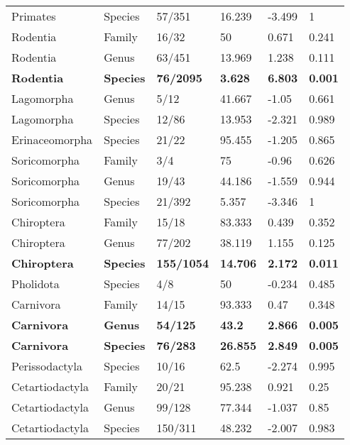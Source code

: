 \begin{longtable}{llllll}
  Primates & Species & 57/351 & 16.239 & -3.499 & 1 \\ 
  Rodentia & Family & 16/32 & 50 & 0.671 & 0.241 \\ 
  Rodentia & Genus & 63/451 & 13.969 & 1.238 & 0.111 \\ 
  \textbf{Rodentia} & \textbf{Species} & \textbf{76/2095} & \textbf{3.628} & \textbf{6.803} & \textbf{0.001} \\ 
  Lagomorpha & Genus & 5/12 & 41.667 & -1.05 & 0.661 \\ 
  Lagomorpha & Species & 12/86 & 13.953 & -2.321 & 0.989 \\ 
  Erinaceomorpha & Species & 21/22 & 95.455 & -1.205 & 0.865 \\ 
  Soricomorpha & Family & 3/4 & 75 & -0.96 & 0.626 \\ 
  Soricomorpha & Genus & 19/43 & 44.186 & -1.559 & 0.944 \\ 
  Soricomorpha & Species & 21/392 & 5.357 & -3.346 & 1 \\ 
  Chiroptera & Family & 15/18 & 83.333 & 0.439 & 0.352 \\ 
  Chiroptera & Genus & 77/202 & 38.119 & 1.155 & 0.125 \\ 
  \textbf{Chiroptera} & \textbf{Species} & \textbf{155/1054} & \textbf{14.706} & \textbf{2.172} & \textbf{0.011} \\ 
  Pholidota & Species & 4/8 & 50 & -0.234 & 0.485 \\ 
  Carnivora & Family & 14/15 & 93.333 & 0.47 & 0.348 \\ 
  \textbf{Carnivora} & \textbf{Genus} & \textbf{54/125} & \textbf{43.2} & \textbf{2.866} & \textbf{0.005} \\ 
  \textbf{Carnivora} & \textbf{Species} & \textbf{76/283} & \textbf{26.855} & \textbf{2.849} & \textbf{0.005} \\ 
  Perissodactyla & Species & 10/16 & 62.5 & -2.274 & 0.995 \\ 
  Cetartiodactyla & Family & 20/21 & 95.238 & 0.921 & 0.25 \\ 
  Cetartiodactyla & Genus & 99/128 & 77.344 & -1.037 & 0.85 \\ 
  Cetartiodactyla & Species & 150/311 & 48.232 & -2.007 & 0.983 \\ 
   \hline
\hline
\end{longtable}
